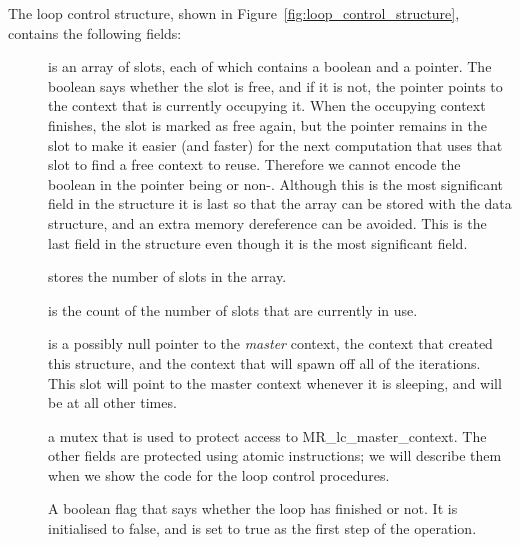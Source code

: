 The loop control structure,
shown in Figure~\ref{fig:loop_control_structure},
contains the following fields:
\begin{description}

\item[]
is an array of slots, each of which contains a boolean and a pointer.
The boolean says whether the slot is free,
and if it is not,
the pointer points to the context that is currently occupying it.
When the occupying context finishes,
the slot is marked as free again,
but the pointer remains in the slot
to make it easier (and faster) for the next computation that uses that slot
to find a free context to reuse.
Therefore we cannot encode the boolean in the pointer being \NULL or non-\NULL.
Although this is the most significant field in the structure it is last so that
the array can be stored with the data structure, and an extra memory
dereference can be avoided.
This is the last field in the structure even though it is the most significant field.

\item[]
stores the number of slots in the array.

\item[]
is the count of the number of slots that are currently in use.

\item[]
is a possibly null pointer to the \emph{master} context,
the context that created this structure,
and the context that will spawn off all of the iterations.
This slot will point to the master context whenever it is sleeping,
and will be \NULL at all other times.

\item[]
a mutex that is used to protect access to MR\_lc\_master\_context.
The other fields are protected using atomic instructions;
we will describe them when we show the code for the loop control procedures.

\item[]
A boolean flag that says whether the loop has finished or not.
It is initialised to false, and is set to true
as the first step of the \lcfinish operation.


\end{description}

